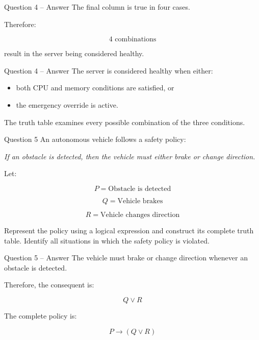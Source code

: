 \begin{frame}{Question 4 -- Answer}
The final column is true in four cases.

Therefore:

$$
\boxed{4\text{ combinations}}
$$

result in the server being considered healthy.
\end{frame}

\begin{frame}{Question 4 -- Answer}
The server is considered healthy when either:

\begin{itemize}
\item both CPU and memory conditions are satisfied, or
\item the emergency override is active.
\end{itemize}

The truth table examines every possible combination of the three
conditions.
\end{frame}


\begin{frame}{Question 5}
An autonomous vehicle follows a safety policy:

\begin{center}
\textit{If an obstacle is detected, then the vehicle must either brake or
change direction.}
\end{center}

Let:

$$
P = \text{Obstacle is detected}
$$

$$
Q = \text{Vehicle brakes}
$$

$$
R = \text{Vehicle changes direction}
$$

Represent the policy using a logical expression and construct its complete
truth table. Identify all situations in which the safety policy is violated.
\end{frame}

\begin{frame}{Question 5 -- Answer}
The vehicle must brake or change direction whenever an obstacle is detected.

Therefore, the consequent is:

$$
Q \lor R
$$

The complete policy is:

$$
P \rightarrow (Q \lor R)
$$

\end{frame}

